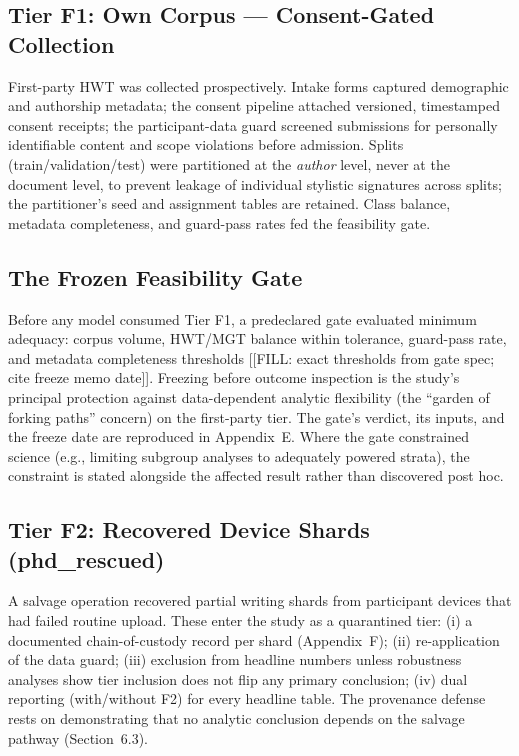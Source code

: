 \subsection{Tier F1: Own Corpus --- Consent-Gated Collection}
First-party HWT was collected prospectively. Intake forms captured
demographic and authorship metadata; the consent pipeline attached
versioned, timestamped consent receipts; the participant-data guard
screened submissions for personally identifiable content and scope
violations before admission. Splits (train/validation/test) were
partitioned at the \emph{author} level, never at the document level, to
prevent leakage of individual stylistic signatures across splits; the
partitioner's seed and assignment tables are retained. Class balance,
metadata completeness, and guard-pass rates fed the feasibility gate.

\subsection{The Frozen Feasibility Gate}
Before any model consumed Tier F1, a predeclared gate evaluated minimum
adequacy: corpus volume, HWT/MGT balance within tolerance, guard-pass
rate, and metadata completeness thresholds [[FILL: exact thresholds from
gate spec; cite freeze memo date]]. Freezing before outcome inspection is
the study's principal protection against data-dependent analytic
flexibility (the ``garden of forking paths'' concern) on the first-party
tier. The gate's verdict, its inputs, and the freeze date are reproduced
in Appendix~E. Where the gate constrained science (e.g., limiting subgroup
analyses to adequately powered strata), the constraint is stated alongside
the affected result rather than discovered post hoc.

\subsection{Tier F2: Recovered Device Shards (phd\_rescued)}
A salvage operation recovered partial writing shards from participant
devices that had failed routine upload. These enter the study as a
quarantined tier: (i) a documented chain-of-custody record per shard
(Appendix~F); (ii) re-application of the data guard; (iii) exclusion from
headline numbers unless robustness analyses show tier inclusion does not
flip any primary conclusion; (iv) dual reporting (with/without F2) for
every headline table. The provenance defense rests on demonstrating that
no analytic conclusion depends on the salvage pathway (Section~6.3).

